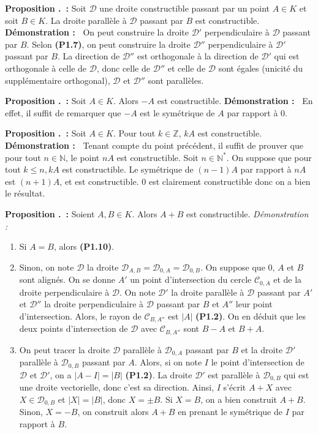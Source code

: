 \documentclass[5pt,a4paper]{article}
\newcounter{prop}[section]
\renewcommand{\theprop}{\thesection.\arabic{prop}}
\newcommand{\prop}[1]{\stepcounter{prop}\noindent\textbf{Proposition \theprop ~:} #1 \newline}
\newcommand{\demo}[1]{\textbf{Démonstration :~} #1 \newline}
\newcommand{\demoEnum}[1]{\textit{Démonstration :~} #1}
\begin{document}
\begin{onehalfspacing}
\prop{Soit $\mathcal{D}$ une droite constructible passant par un point $A \in K$ et soit $B \in K$. La droite parallèle à $\mathcal{D}$ passant par $B$ est constructible.}
\demo{On peut construire la droite $\mathcal{D}'$ perpendiculaire à $\mathcal{D}$ passant par $B$. Selon \textbf{(P1.7)}, on peut construire la droite $\mathcal{D}''$ perpendiculaire à $\mathcal{D}'$ passant par $B$. La direction de $\mathcal{D}''$ est orthogonale à la direction de $\mathcal{D}'$ qui est orthogonale à celle de $\mathcal{D}$, donc celle de $\mathcal{D}''$ et celle de $\mathcal{D}$ sont égales (unicité du supplémentaire orthogonal), $\mathcal{D}$ et $\mathcal{D}''$ sont parallèles.}

\prop{Soit $A \in K$. Alors $-A$ est constructible.}
\demo{En effet, il suffit de remarquer que $-A$ est le symétrique de $A$ par rapport à $0$.}

\prop{Soit $A \in K$. Pour tout $k \in \mathbb{Z}$, $kA$ est constructible.}
\demo{Tenant compte du point précédent, il suffit de prouver que pour tout $n \in \mathbb{N}$, le point $nA$ est constructible. Soit $n \in \mathbb{N}^*$. On suppose que pour tout $k \leq n, kA$ est constructible. Le symétrique de $(n-1)A$ par rapport à $nA$ est $(n+1)A$, et est constructible. $0$ est clairement constructible donc on a bien le résultat.}

\prop{Soient $A, B \in K$. Alors $A+B$ est constructible.}
\demoEnum{
\begin{enumerate}
    \item Si $A = B$, alors \textbf{(P1.10)}.
    \item Sinon, on note $\mathcal{D}$ la droite $\mathcal{D}_{A,B} = \mathcal{D}_{0,A} = \mathcal{D}_{0,B}$. On suppose que $0$, $A$ et $B$ sont alignés. On se donne $A'$ un point d'intersection du cercle $\mathcal{C}_{0, A}$ et de la droite perpendiculaire à $\mathcal{D}$. On note $\mathcal{D}'$ la droite parallèle à $\mathcal{D}$ passant par $A'$ et $\mathcal{D}''$ la droite perpendiculaire à $\mathcal{D}$ passant par $B$ et $A''$ leur point d'intersection. Alors, le rayon de $\mathcal{C}_{B, A''}$ est $|A|$ \textbf{(P1.2)}. On en déduit que les deux points d'intersection de $\mathcal{D}$ avec $\mathcal{C}_{B, A''}$ sont $B-A$ et $B+A$.
    \item On peut tracer la droite $\mathcal{D}$ parallèle à $\mathcal{D}_{0, A}$ passant par $B$ et la droite $\mathcal{D}'$ parallèle à $\mathcal{D}_{0, B}$ passant par $A$. Alors, si on note $I$ le point d'intersection de $\mathcal{D}$ et $\mathcal{D}'$, on a $|A-I| = |B|$ \textbf{(P1.2)}. La droite $\mathcal{D}'$ est parallèle à $\mathcal{D}_{0, B}$ qui est une droite vectorielle, donc c'est sa direction. Ainsi, $I$ s'écrit $A + X$ avec $X \in \mathcal{D}_{0, B}$ et $|X| = |B|$, donc $X = \pm B$. Si $X = B$, on a bien construit $A+B$. Sinon, $X = -B$, on construit alors $A+B$ en prenant le symétrique de $I$ par rapport à $B$.
\end{enumerate} 
}


\end{onehalfspacing}
\end{document}
